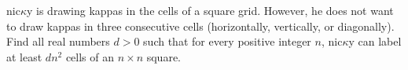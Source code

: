 nic$\kappa$y is drawing kappas in the cells of a square grid. However, he does not want to draw kappas in three consecutive cells (horizontally, vertically, or diagonally). Find all real numbers $d>0$ such that for every positive integer $n$, nic$\kappa$y can label at least $dn^2$ cells of an $n\times n$ square.